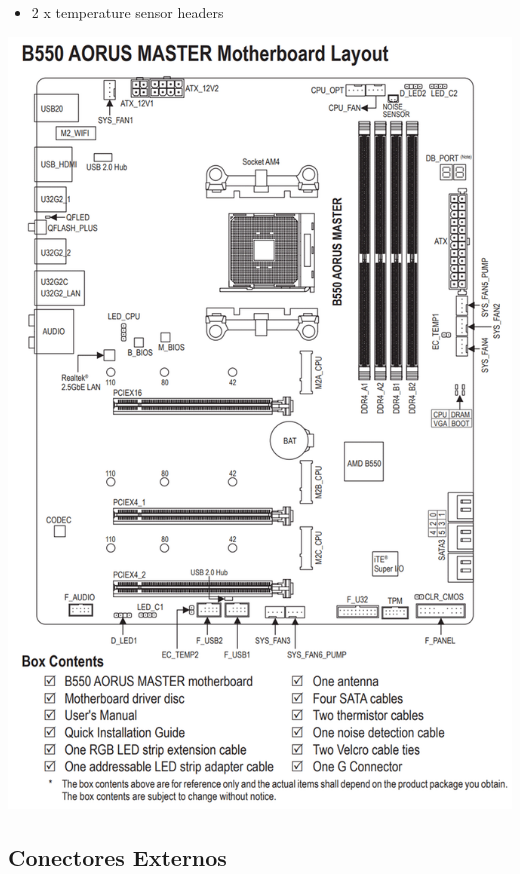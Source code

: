 \documentclass{article}
\begin{document}
\begin{itemize}
\begin{minipage}{0.5\textwidth}
\begin{itemize}
        \item 2 x temperature sensor headers
      \end{itemize}
    \end{minipage}
    \begin{minipage}{\textwidth}
      \includegraphics[scale=0.25]{img/B550AORUSMasterDiagram.png}
    \end{minipage}
  \end{itemize}

\newpage
\subsection{Conectores Externos}
\end{document}
